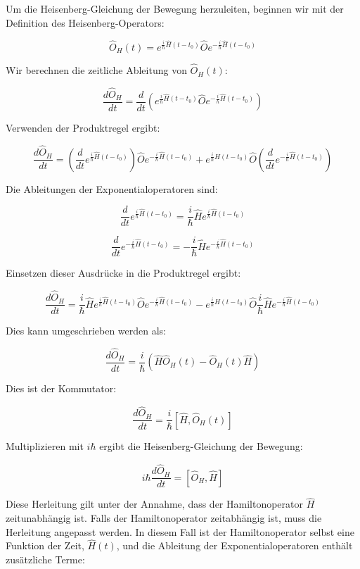 Um die Heisenberg-Gleichung der Bewegung herzuleiten, beginnen wir mit der Definition des Heisenberg-Operators:

\[
\hat{O}_H(t) = e^{\frac{i}{\hbar} \hat{H}(t-t_0)} \hat{O} e^{-\frac{i}{\hbar} \hat{H}(t-t_0)}
\]

Wir berechnen die zeitliche Ableitung von \(\hat{O}_H(t)\):

\[
\frac{d \hat{O}_H}{d t} = \frac{d}{d t} \left( e^{\frac{i}{\hbar} \hat{H}(t-t_0)} \hat{O} e^{-\frac{i}{\hbar} \hat{H}(t-t_0)} \right)
\]

Verwenden der Produktregel ergibt:

\[
\frac{d \hat{O}_H}{d t} = \left( \frac{d}{d t} e^{\frac{i}{\hbar} \hat{H}(t-t_0)} \right) \hat{O} e^{-\frac{i}{\hbar} \hat{H}(t-t_0)} + e^{\frac{i}{\hbar} \hat{H}(t-t_0)} \hat{O} \left( \frac{d}{d t} e^{-\frac{i}{\hbar} \hat{H}(t-t_0)} \right)
\]

Die Ableitungen der Exponentialoperatoren sind:

\[
\frac{d}{d t} e^{\frac{i}{\hbar} \hat{H}(t-t_0)} = \frac{i}{\hbar} \hat{H} e^{\frac{i}{\hbar} \hat{H}(t-t_0)}
\]

\[
\frac{d}{d t} e^{-\frac{i}{\hbar} \hat{H}(t-t_0)} = -\frac{i}{\hbar} \hat{H} e^{-\frac{i}{\hbar} \hat{H}(t-t_0)}
\]

Einsetzen dieser Ausdrücke in die Produktregel ergibt:

\[
\frac{d \hat{O}_H}{d t} = \frac{i}{\hbar} \hat{H} e^{\frac{i}{\hbar} \hat{H}(t-t_0)} \hat{O} e^{-\frac{i}{\hbar} \hat{H}(t-t_0)} - e^{\frac{i}{\hbar} \hat{H}(t-t_0)} \hat{O} \frac{i}{\hbar} \hat{H} e^{-\frac{i}{\hbar} \hat{H}(t-t_0)}
\]

Dies kann umgeschrieben werden als:

\[
\frac{d \hat{O}_H}{d t} = \frac{i}{\hbar} \left( \hat{H} \hat{O}_H(t) - \hat{O}_H(t) \hat{H} \right)
\]

Dies ist der Kommutator:

\[
\frac{d \hat{O}_H}{d t} = \frac{i}{\hbar} [\hat{H}, \hat{O}_H(t)]
\]

Multiplizieren mit \(i \hbar\) ergibt die Heisenberg-Gleichung der Bewegung:

\[
i \hbar \frac{d \hat{O}_H}{d t} = [\hat{O}_H, \hat{H}]
\]

Diese Herleitung gilt unter der Annahme, dass der Hamiltonoperator \(\hat{H}\) zeitunabhängig ist. Falls der Hamiltonoperator zeitabhängig ist, muss die Herleitung angepasst werden. In diesem Fall ist der Hamiltonoperator selbst eine Funktion der Zeit, \(\hat{H}(t)\), und die Ableitung der Exponentialoperatoren enthält zusätzliche Terme:

